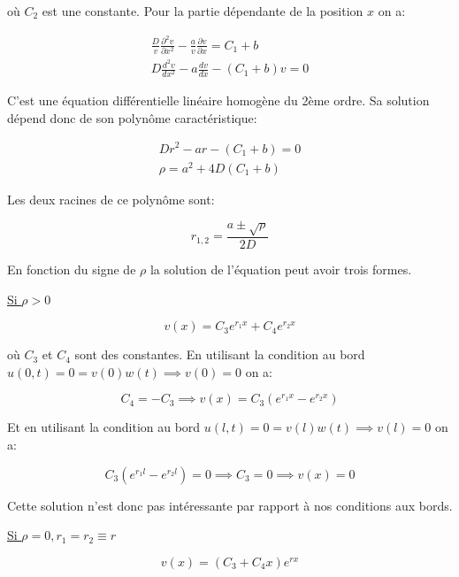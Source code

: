 \documentclass[a4paper, 12pt]{report}
\begin{document}
où $C_{2}$ est une constante. Pour la partie dépendante de la position $x$
on a:

\begin{align}
  \frac{D}{v} \frac{\partial^2v}{\partial x^2} - \frac{a}{v} \frac{\partial v}{\partial x} = C_1 + b\\
  D \frac{d^2v}{d x^2} - a \frac{d v}{d x} - (C_1 + b) v = 0
\end{align}

C'est une équation différentielle linéaire homogène du 2ème ordre. Sa solution
dépend donc de son polynôme caractéristique:

\begin{align}
  D r^2 - a r - (C_1 + b) = 0\\
  \rho = a^2 + 4 D (C_1 + b)
\end{align}

Les deux racines de ce polynôme sont:

\begin{equation}
   r_{1,2} = \frac{a \pm \sqrt{\rho}}{2 D}
 \end{equation}

En fonction du signe de $\rho$ la solution de l'équation peut avoir trois formes.

\underline{Si $\rho > 0$}

\begin{equation}
  v(x) = C_3 e^{r_1 x} + C_4 e^{r_2 x}
\end{equation}

où $C_3$ et $C_4$ sont des constantes. En utilisant la condition au bord
$u(0,t) = 0 = v(0) w(t) \implies v(0) = 0$ on a:

\begin{equation}
  C_4 = -C_3 \implies  v(x) = C_3 (e^{r_1 x} - e^{r_2 x})
\end{equation}

Et en utilisant la condition au bord $u(l,t) = 0 = v(l) w(t) \implies v(l) = 0$ on a:

\begin{equation}
  C_3 (e^{r_1 l} - e^{r_2 l}) = 0 \implies C_{3} = 0 \implies v(x) = 0
\end{equation}

Cette solution n'est donc pas intéressante par rapport à nos conditions aux bords.

\underline{Si $\rho = 0, r_1 = r_2 \equiv r$}

\begin{equation}
  v(x) = (C_3 + C_4 x) e^{r x}
\end{equation}
\end{document}
